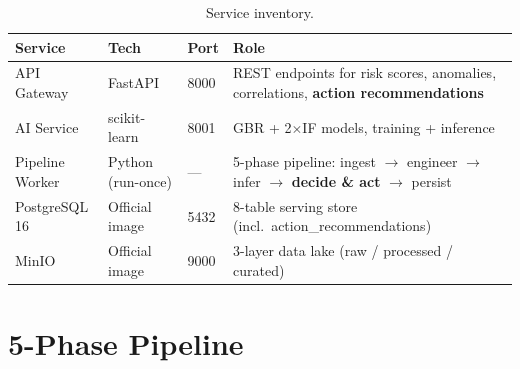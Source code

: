 \documentclass[12pt,a4paper]{report}
\begin{document}
\begin{table}[H]
\centering\small
\caption{Service inventory.}
\begin{tabularx}{\textwidth}{@{}lllX@{}}
\toprule
\textbf{Service} & \textbf{Tech} & \textbf{Port} & \textbf{Role} \\
\midrule
API Gateway     & FastAPI          & 8000 & REST endpoints for risk scores, anomalies, correlations, \textbf{action recommendations} \\
AI Service      & scikit-learn     & 8001 & GBR + 2$\times$IF models, training + inference \\
Pipeline Worker & Python (run-once)& ---  & 5-phase pipeline: ingest $\to$ engineer $\to$ infer $\to$ \textbf{decide \& act} $\to$ persist \\
PostgreSQL 16   & Official image   & 5432 & 8-table serving store (incl.\ action\_recommendations) \\
MinIO           & Official image   & 9000 & 3-layer data lake (raw / processed / curated) \\
\bottomrule
\end{tabularx}
\end{table}

\section{5-Phase Pipeline}
\end{document}

